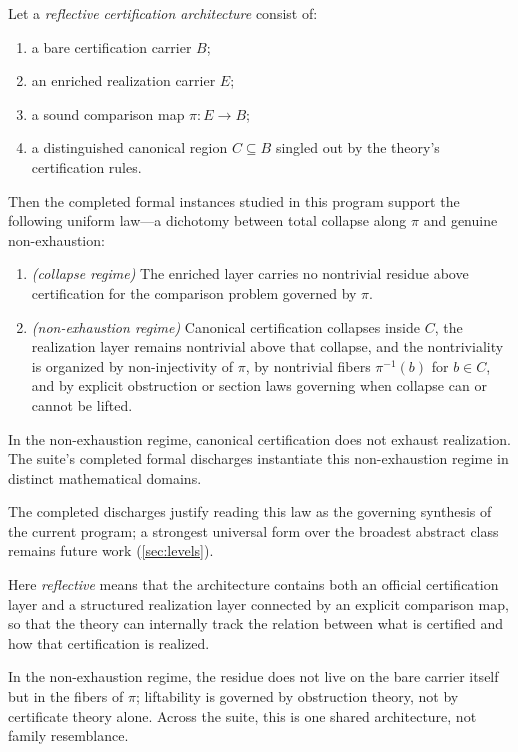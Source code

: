 \documentclass[11pt]{article}
\begin{document}
\begin{theorem}\label{thm:rne}
Let a \emph{reflective certification architecture} consist of:
\begin{enumerate}[label=(\roman*)]
  \item a bare certification carrier $B$;
  \item an enriched realization carrier $E$;
  \item a sound comparison map $\pi : E \to B$;
  \item a distinguished canonical region $C \subseteq B$ singled out by the theory's
    certification rules.
\end{enumerate}
Then the completed formal instances studied in this program support the following
uniform law---a dichotomy between total collapse along $\pi$ and genuine
non-exhaustion:
\begin{enumerate}[label=(\alph*)]
  \item \emph{(collapse regime)} The enriched layer carries no nontrivial residue
    above certification for the comparison problem governed by $\pi$.
  \item \emph{(non-exhaustion regime)} Canonical certification collapses inside $C$,
    the realization layer remains nontrivial above that collapse, and the
    nontriviality is organized by non-injectivity of $\pi$, by nontrivial fibers
    $\pi^{-1}(b)$ for $b \in C$, and by explicit obstruction or section laws governing
    when collapse can or cannot be lifted.
\end{enumerate}
In the non-exhaustion regime, canonical certification does not exhaust realization.
The suite's completed formal discharges instantiate this non-exhaustion regime in
distinct mathematical domains.
\end{theorem}

\noindent
The completed discharges justify reading this law as the governing synthesis of the
current program; a strongest universal form over the broadest abstract class remains
future work (\cref{sec:levels}).

\noindent
Here \emph{reflective} means that the architecture contains both an official
certification layer and a structured realization layer connected by an explicit
comparison map, so that the theory can internally track the relation between what
is certified and how that certification is realized.

\noindent
In the non-exhaustion regime, the residue does not live on the bare carrier itself
but in the fibers of $\pi$; liftability is governed by obstruction theory, not by
certificate theory alone. Across the suite, this is one shared architecture, not
family resemblance.
\end{document}
